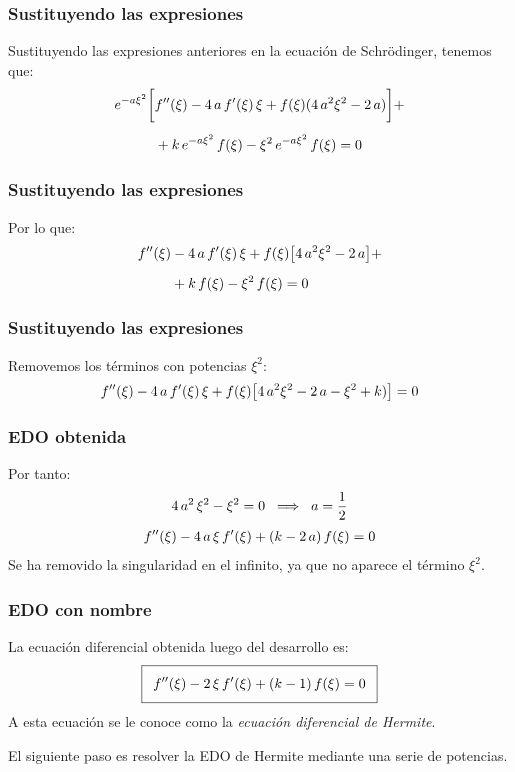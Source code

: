 \documentclass[12pt]{beamer}
\begin{document}
\begin{frame}
\frametitle{Sustituyendo las expresiones}
Sustituyendo las expresiones anteriores en la ecuación de Schrödinger, tenemos que:
\pause
\begin{align*}
e^{-a \xi^{2}} \bigg[ &{f}^{\prime \prime}(\xi) - 4 \, a \, {f}^{\prime}(\xi) \, \xi + f(\xi) (4 \, a^{2} \xi^{2} - 2 \, a) \bigg] + \\[0.5em]
&+ k \, e^{-a \xi^{2}} \, f(\xi) - \xi^{2} \, e^{-a \xi^{2}} \, f(\xi) = 0
\end{align*}
\end{frame}
\begin{frame}
\frametitle{Sustituyendo las expresiones}
Por lo que:
\pause
\begin{align*}
{f}^{\prime \prime}(\xi) &- 4 \, a \, {f}^{\prime}(\xi) \, \xi + f(\xi) \big[ 4 \, a^{2} \xi^{2} - 2 \, a \big] + \\[0.5em]
&+ k \, f(\xi) - \xi^{2} \, f(\xi) = 0
\end{align*}
\end{frame}
\begin{frame}
\frametitle{Sustituyendo las expresiones}
Removemos los términos con potencias $\xi^{2}$:
\pause
\begin{align*}
{f}^{\prime \prime}(\xi) - 4 \, a \, {f}^{\prime}(\xi) \, \xi + f(\xi) \big[ 4 \, a^{2} \xi^{2} - 2 \, a - \xi^{2} +  k) \big] = 0
\end{align*}
\end{frame}
\begin{frame}
\frametitle{EDO obtenida}
Por tanto:
\pause
\begin{align*}
4 \, a^{2} \, \xi^{2} - \xi^{2} = 0 \hspace{0.2cm} \Longrightarrow \hspace{0.2cm} a = \dfrac{1}{2}
\end{align*}
\pause
\begin{align*}
{f}^{\prime \prime}(\xi) - 4 \, a \, \xi \, {f}^{\prime}(\xi) + (k - 2 \, a) \, f(\xi) = 0
\end{align*}    
Se ha removido la singularidad en el infinito, ya que no aparece el término $\xi^{2}$.
\end{frame}
\begin{frame}
\frametitle{EDO con nombre}
La ecuación diferencial obtenida luego del desarrollo es:
\pause
\begin{align*}
\addtolength{\fboxsep}{5pt}\boxed{
\stilde{f} (\xi) - 2 \, \xi \, \ptilde{f}(\xi) + (k - 1) \, f(\xi) = 0}
\end{align*}
A esta ecuación se le conoce como la \emph{ecuación diferencial de Hermite}.
\pause
\\
\par
El siguiente paso es resolver la EDO de Hermite mediante una serie de potencias.
\end{frame}
\end{document}
